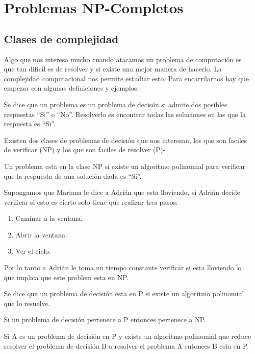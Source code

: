 \chapter{Problemas NP-Completos}

\section{Clases de complejidad}
Algo que nos interesa mucho cuando atacamos un problema de computación es que tan dificíl es de resolver y si existe una mejor manera de hacerlo. La complejidad computacional nos permite estudiar esto. Para encarrilarnos hay que empezar con algunas definiciones y ejemplos.
\begin{dfn}
Se dice que un problema es un problema de decisón si admite dos posibles respuestas ``Si'' o ``No''. Resolverlo es encontrar todas las soluciones en las que la respuesta es ``Si''.
\end{dfn}
Existen dos clases de problemas de decisión que nos interesan, los que son faciles de verificar (NP) y los que son faciles de resolver (P)-
\begin{dfn}
Un problema esta en la clase NP si existe un algoritmo polinomial para verificar que la respuesta de una solución dada es ``Si''.
\end{dfn}

\begin{eje}
Supongamos que Mariana le dice a Adrián que esta lloviendo, si Adrián decide verificar si esto es cierto solo tiene que realizar tres pasos:
\begin{enumerate}
\item Caminar a la ventana.
\item Abrir la ventana.
\item Ver el cielo.
\end{enumerate}
Por lo tanto a Adrián le toma un tiempo constante verificar si esta lloviendo lo que implica que este problem esta en NP.
\end{eje}
\begin{dfn}
Se dice que un problema de decisión esta en P si existe un algoritmo polinomial que lo resuelve.
\end{dfn}
\begin{obs}[$P  \subseteq NP$]
Si un problema de decisión pertenece a P entonces pertenece a NP.
\end{obs}
\begin{obs}
\label{pp eq}
Si A es un problema de decisión en P y existe un algoritmo polinomial que reduce resolver el problema de decisión B a resolver el problema A entonces B esta en P.
\end{obs}

